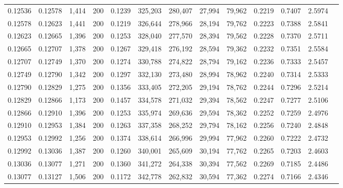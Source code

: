 \begin{tabular}{rrrrrrrrrrrrr}
0.12536 & 0.12578 & 1,414 & 200 &                                     0.1239 & 325,203 & 280,407 &  27,994 &  79,962 & 0.2219 & 0.7407 & 2.5974 \\
0.12578 & 0.12623 & 1,441 & 200 &                                     0.1219 & 326,644 & 278,966 &  28,194 &  79,762 & 0.2223 & 0.7388 & 2.5841 \\
0.12623 & 0.12665 & 1,396 & 200 &                                     0.1253 & 328,040 & 277,570 &  28,394 &  79,562 & 0.2228 & 0.7370 & 2.5711 \\
0.12665 & 0.12707 & 1,378 & 200 &                                     0.1267 & 329,418 & 276,192 &  28,594 &  79,362 & 0.2232 & 0.7351 & 2.5584 \\
0.12707 & 0.12749 & 1,370 & 200 &                                     0.1274 & 330,788 & 274,822 &  28,794 &  79,162 & 0.2236 & 0.7333 & 2.5457 \\
0.12749 & 0.12790 & 1,342 & 200 &                                     0.1297 & 332,130 & 273,480 &  28,994 &  78,962 & 0.2240 & 0.7314 & 2.5333 \\
0.12790 & 0.12829 & 1,275 & 200 &                                     0.1356 & 333,405 & 272,205 &  29,194 &  78,762 & 0.2244 & 0.7296 & 2.5214 \\
0.12829 & 0.12866 & 1,173 & 200 &                                     0.1457 & 334,578 & 271,032 &  29,394 &  78,562 & 0.2247 & 0.7277 & 2.5106 \\
0.12866 & 0.12910 & 1,396 & 200 &                                     0.1253 & 335,974 & 269,636 &  29,594 &  78,362 & 0.2252 & 0.7259 & 2.4976 \\
0.12910 & 0.12953 & 1,384 & 200 &                                     0.1263 & 337,358 & 268,252 &  29,794 &  78,162 & 0.2256 & 0.7240 & 2.4848 \\
0.12953 & 0.12992 & 1,256 & 200 &                                     0.1374 & 338,614 & 266,996 &  29,994 &  77,962 & 0.2260 & 0.7222 & 2.4732 \\
0.12992 & 0.13036 & 1,387 & 200 &                                     0.1260 & 340,001 & 265,609 &  30,194 &  77,762 & 0.2265 & 0.7203 & 2.4603 \\
0.13036 & 0.13077 & 1,271 & 200 &                                     0.1360 & 341,272 & 264,338 &  30,394 &  77,562 & 0.2269 & 0.7185 & 2.4486 \\
0.13077 & 0.13127 & 1,506 & 200 &                                     0.1172 & 342,778 & 262,832 &  30,594 &  77,362 & 0.2274 & 0.7166 & 2.4346 \\

\end{tabular}

